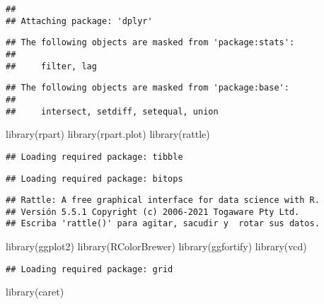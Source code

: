 \documentclass[
]{article}
\newenvironment{Shaded}{\begin{snugshade}}{\end{snugshade}}
\newcommand{\FunctionTok}[1]{\textcolor[rgb]{0.00,0.00,0.00}{#1}}
\newcommand{\NormalTok}[1]{#1}
\begin{document}
\begin{verbatim}
## 
## Attaching package: 'dplyr'
\end{verbatim}

\begin{verbatim}
## The following objects are masked from 'package:stats':
## 
##     filter, lag
\end{verbatim}

\begin{verbatim}
## The following objects are masked from 'package:base':
## 
##     intersect, setdiff, setequal, union
\end{verbatim}

\begin{Shaded}
\begin{Highlighting}[]
\FunctionTok{library}\NormalTok{(rpart)}
\FunctionTok{library}\NormalTok{(rpart.plot)}
\FunctionTok{library}\NormalTok{(rattle)}
\end{Highlighting}
\end{Shaded}

\begin{verbatim}
## Loading required package: tibble
\end{verbatim}

\begin{verbatim}
## Loading required package: bitops
\end{verbatim}

\begin{verbatim}
## Rattle: A free graphical interface for data science with R.
## Versión 5.5.1 Copyright (c) 2006-2021 Togaware Pty Ltd.
## Escriba 'rattle()' para agitar, sacudir y  rotar sus datos.
\end{verbatim}

\begin{Shaded}
\begin{Highlighting}[]
\FunctionTok{library}\NormalTok{(ggplot2)}
\FunctionTok{library}\NormalTok{(RColorBrewer)}
\FunctionTok{library}\NormalTok{(ggfortify)}
\FunctionTok{library}\NormalTok{(vcd)}
\end{Highlighting}
\end{Shaded}

\begin{verbatim}
## Loading required package: grid
\end{verbatim}

\begin{Shaded}
\begin{Highlighting}[]
\FunctionTok{library}\NormalTok{(caret)}
\end{Highlighting}
\end{Shaded}
\end{document}
